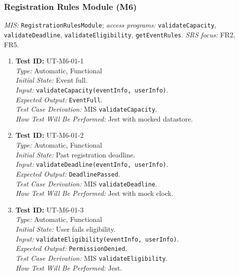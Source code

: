 \documentclass[12pt, titlepage]{article}
\begin{document}
\subsubsection{Registration Rules Module (M6)}

\textit{MIS:} \texttt{RegistrationRulesModule}; \textit{access programs:} \texttt{validateCapacity}, \texttt{validateDeadline}, \texttt{validateEligibility}, \texttt{getEventRules}. \textit{SRS focus:} FR2, FR5.

\begin{enumerate}\setlength{\itemsep}{0.85em}
    \item \textbf{Test ID:} UT-M6-01-1\\[0.25em]
    \textit{Type:} Automatic, Functional\\
    \textit{Initial State:} Event full.\\
    \textit{Input:} \texttt{validateCapacity(eventInfo, userInfo)}.\\
    \textit{Expected Output:} \texttt{EventFull}.\\
    \textit{Test Case Derivation:} MIS \texttt{validateCapacity}.\\
    \textit{How Test Will Be Performed:} Jest with mocked datastore.

    \item \textbf{Test ID:} UT-M6-01-2\\[0.25em]
    \textit{Type:} Automatic, Functional\\
    \textit{Initial State:} Past registration deadline.\\
    \textit{Input:} \texttt{validateDeadline(eventInfo, userInfo)}.\\
    \textit{Expected Output:} \texttt{DeadlinePassed}.\\
    \textit{Test Case Derivation:} MIS \texttt{validateDeadline}.\\
    \textit{How Test Will Be Performed:} Jest with mock clock.

    \item \textbf{Test ID:} UT-M6-01-3\\[0.25em]
    \textit{Type:} Automatic, Functional\\
    \textit{Initial State:} User fails eligibility.\\
    \textit{Input:} \texttt{validateEligibility(eventInfo, userInfo)}.\\
    \textit{Expected Output:} \texttt{PermissionDenied}.\\
    \textit{Test Case Derivation:} MIS \texttt{validateEligibility}.\\
    \textit{How Test Will Be Performed:} Jest.


\end{enumerate}
\end{document}
